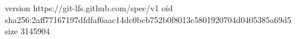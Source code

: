 version https://git-lfs.github.com/spec/v1
oid sha256:2aff77167197dfdfaf6aac14dc0bcb752b0f8013c5801920704d0405385a69d5
size 3145904
